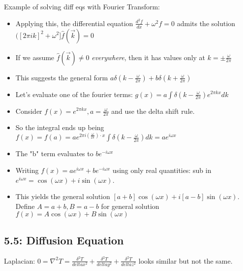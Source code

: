 \documentclass[11pt, oneside]{article}   	%
\begin{document}
Example of solving diff eqs with Fourier Transform:
\begin{itemize}
\item Applying this, the differential equation $\frac{d^2f}{dx} + \omega^2 f = 0$ admits the solution $([2\pi i k]^2 + \omega^2] \hat{f}(\vec{k}) = 0$
\item If we assume $\hat{f}(\vec{k}) \neq 0$ \emph{everywhere}, then it has values only at $k = \pm \frac{\omega}{2\pi}$
\item This suggests the general form $a \delta(k-\frac{\omega}{2\pi}) + b \delta(k+\frac{\omega}{2\pi})$
\item Let's evaluate one of the fourier terms: $g(x) =a \int \delta(k-\frac{\omega}{2\pi}) e^{2\pi k x} dk$
\item Consider $f(x) =e^{2\pi k x}, a = \frac{\omega}{2\pi}$ and use the delta shift rule.
\item So the integral ends up being $f(x) = f(a) = a e^{2\pi i (\frac{\omega}{2\pi})\cdot x}\int \delta(k-\frac{\omega}{2\pi})dk = ae^{i\omega x}$
\item The "b" term evaluates to $be^{-i \omega x}$
\item Writing $f(x) = ae^{i\omega x} + be^{-i\omega x}$ using only real quantities: sub in $e^{i\omega x} = \cos(\omega x) + i\sin(\omega x)$.
\item This yields the general solution $[a+b]\cos(\omega x) + i[a-b]\sin(\omega x).$  Define $A = a+b, B  =a-b$ for general solution $f(x) = A\cos(\omega x) + B\sin(\omega x)$
\end{itemize}


\subsection{5.5: Diffusion Equation}

 Laplacian: $0 = \nabla ^2 T = \frac{\delta ^2 T}{delta x^2} +  \frac{\delta ^2 T}{delta y^2} +  \frac{\delta ^2 T}{delta z^2}$ looks similar but not the same.
\end{document}
